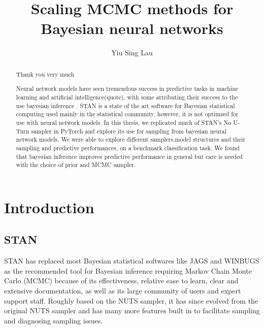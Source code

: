 \documentclass[]{report}
\title{Scaling MCMC methods for Bayesian neural networks}
\author{Yiu Sing Lau}
\date{}
\begin{document}
\maketitle

\renewcommand{\abstractname}{ACKNOWLEDGEMENTS}
\begin{abstract}
Thank you very much

\end{abstract}

\renewcommand{\abstractname}{ABSTRACT}

\begin{abstract}
Neural network models have seen tremendous success in predictive tasks in machine learning and artificial intelligence(quote), with some attributing their success to the use bayesian inference \cite{mandt2017stochastic}. STAN is a state of the art software for Bayesian statistical computing used mainly in the statistical community, however, it is not optimzed for use with neural network models. In this thesis, we replicated much of STAN's No U-Turn sampler in PyTorch and explore its use for sampling from bayesian neural network models. We were able to explore different samplers,model structures and their sampling and predictive performances, on a benchmark classification task. We found that bayesian inference improves predictive performance in general but care is needed with the choice of prior and MCMC sampler. 

\end{abstract}
\tableofcontents 

\chapter{Introduction}
\section{STAN}

STAN has replaced most Bayesian statistical softwares like JAGS and WINBUGS as the recommended tool for Bayesian inference requiring Markov Chain Monte Carlo (MCMC)  because of its effectiveness, relative ease to learn, clear and extensive documentation, as well as its large community of users and expert support staff. Roughly based on the NUTS sampler, it has since evolved from the original NUTS sampler and has many more features built in to facilitate sampling and diagnosing sampling issues.
\end{document}
